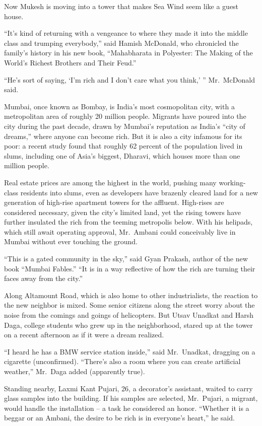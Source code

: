 ﻿\documentclass[12pt]{article}
\begin{document}
Now Mukesh is moving into a tower that makes Sea Wind seem like a guest house.

``It's kind of returning with a vengeance to where they made it into the middle class and trumping
everybody,'' said Hamish McDonald, who chronicled the family's history in his new book,
``Mahabharata in Polyester: The Making of the World's Richest Brothers and Their Feud.''

``He's sort of saying, `I'm rich and I don't care what you think,' '' Mr.~McDonald said.

Mumbai, once known as Bombay, is India's most cosmopolitan city, with a metropolitan area of roughly
20 million people. Migrants have poured into the city during the past decade, drawn by Mumbai's
reputation as India's ``city of dreams,'' where anyone can become rich. But it is also a city
infamous for its poor: a recent study found that roughly 62 percent of the population lived in
slums, including one of Asia's biggest, Dharavi, which houses more than one million people.

Real estate prices are among the highest in the world, pushing many working-class residents into
slums, even as developers have brazenly cleared land for a new generation of high-rise apartment
towers for the affluent. High-rises are considered necessary, given the city's limited land, yet the
rising towers have further insulated the rich from the teeming metropolis below. With his helipads,
which still await operating approval, Mr.~Ambani could conceivably live in Mumbai without ever
touching the ground.

``This is a gated community in the sky,'' said Gyan Prakash, author of the new book ``Mumbai
Fables.'' ``It is in a way reflective of how the rich are turning their faces away from the city.''

Along Altamount Road, which is also home to other industrialists, the reaction to the new neighbor
is mixed. Some senior citizens along the street worry about the noise from the comings and goings of
helicopters. But Utsav Unadkat and Harsh Daga, college students who grew up in the neighborhood,
stared up at the tower on a recent afternoon as if it were a dream realized.

``I heard he has a BMW service station inside,'' said Mr.~Unadkat, dragging on a cigarette
(unconfirmed). ``There's also a room where you can create artificial weather,'' Mr.~Daga added
(apparently true).

Standing nearby, Laxmi Kant Pujari, 26, a decorator's assistant, waited to carry glass samples into
the building. If his samples are selected, Mr.~Pujari, a migrant, would handle the installation -- a
task he considered an honor. ``Whether it is a beggar or an Ambani, the desire to be rich is in
everyone's heart,'' he said.
\end{document}
